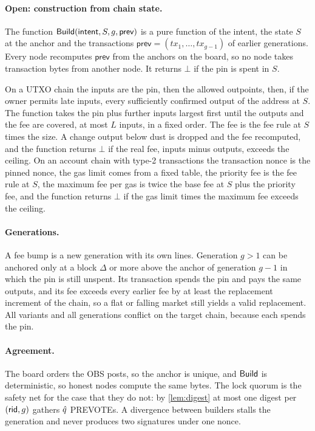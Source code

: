 \paragraph{Open: construction from chain state.} The function $\mathsf{Build}(\textsf{intent}, S, g, \textsf{prev})$ is a pure function of the intent, the state $S$ at the anchor and the transactions $\textsf{prev} = (tx_1, \dots, tx_{g-1})$ of earlier generations. Every node recomputes $\textsf{prev}$ from the anchors on the board, so no node takes transaction bytes from another node. It returns $\bot$ if the pin is spent in $S$.

On a UTXO chain the inputs are the pin, then the allowed outpoints, then, if the owner permits late inputs, every sufficiently confirmed output of the address at $S$. The function takes the pin plus further inputs largest first until the outputs and the fee are covered, at most $L$ inputs, in a fixed order. The fee is the fee rule at $S$ times the size. A change output below dust is dropped and the fee recomputed, and the function returns $\bot$ if the real fee, inputs minus outputs, exceeds the ceiling. On an account chain with type-2 transactions the transaction nonce is the pinned nonce, the gas limit comes from a fixed table, the priority fee is the fee rule at $S$, the maximum fee per gas is twice the base fee at $S$ plus the priority fee, and the function returns $\bot$ if the gas limit times the maximum fee exceeds the ceiling.

\paragraph{Generations.} A fee bump is a new generation with its own lines. Generation $g > 1$ can be anchored only at a block $\Delta$ or more above the anchor of generation $g-1$ in which the pin is still unspent. Its transaction spends the pin and pays the same outputs, and its fee exceeds every earlier fee by at least the replacement increment of the chain, so a flat or falling market still yields a valid replacement. All variants and all generations conflict on the target chain, because each spends the pin.

\paragraph{Agreement.} The board orders the OBS posts, so the anchor is unique, and $\mathsf{Build}$ is deterministic, so honest nodes compute the same bytes. The lock quorum is the safety net for the case that they do not: by \cref{lem:digest} at most one digest per $(\mathsf{rid}, g)$ gathers $\hat{q}$ PREVOTEs. A divergence between builders stalls the generation and never produces two signatures under one nonce.

